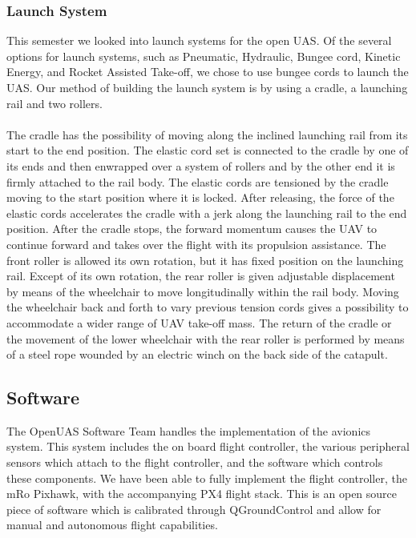 \documentclass{article}
\begin{document}
\subsubsection{Launch System}
This semester we looked into launch systems for the open UAS. Of the several options for launch systems, such as Pneumatic, Hydraulic, Bungee cord, Kinetic Energy, and Rocket Assisted Take-off, we chose to use bungee cords to launch the UAS. Our method of building the launch system is by using a cradle, a launching rail and two rollers. 
\\
\\The cradle has the possibility of moving along the inclined launching rail from its start to the end position. The elastic cord set is connected to the cradle by one of its ends and then enwrapped over a system of rollers and by the other end it is firmly attached to the rail body. The elastic cords are tensioned by the cradle moving to the start position where it is locked. After releasing, the force of the elastic cords accelerates the cradle with a jerk along the launching rail to the end position. After the cradle stops, the forward momentum causes the UAV to continue forward and takes over the flight with its propulsion assistance. The front roller is allowed its own rotation, but it has fixed position on the launching rail. Except of its own rotation, the rear roller is given adjustable displacement by means of the wheelchair to move longitudinally within the rail body. Moving the wheelchair back and forth to vary previous tension cords gives a possibility to accommodate a wider range of UAV take-off mass. The return of the cradle or the movement of the lower wheelchair with the rear roller is performed by means of a steel rope wounded by an electric winch on the back side of the catapult.


\subsection{Software}

The OpenUAS Software Team handles the implementation of the avionics system. This system includes the on board flight controller, the various peripheral sensors which attach to the flight controller, and the software which controls these components. We have been able to fully implement the flight controller, the mRo Pixhawk, with the accompanying PX4 flight stack. This is an open source piece of software which is calibrated through QGroundControl and allow for manual and autonomous flight capabilities.\\
\end{document}
